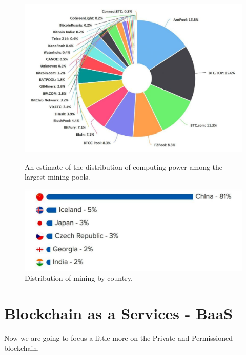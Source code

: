 \documentclass{article}
\begin{document}
    
    \begin{figure}[h]
        \begin{minipage}[c]{0.45\linewidth}
            \includegraphics[width=\linewidth]{bitcoin-mining-pools-1024x701.jpg}
            \caption{An estimate of the distribution of computing power among the largest mining pools. \cite{miningpools}}
            \label{fig:bitcoin-mining-pools}
        \end{minipage}
        \hfill
        \begin{minipage}[c]{0.45\linewidth}
            \includegraphics[width=\linewidth]{mining-by-countries-1024x386.jpg}
            \caption{Distribution of mining by country. \cite{miningpools}}
            \label{fig:mining-by-countries}
        \end{minipage}
    \end{figure}
    
\section{Blockchain as a Services - BaaS}
    Now we are going to focus a little more on the Private and Permissioned blockchain.
   
\end{document}

